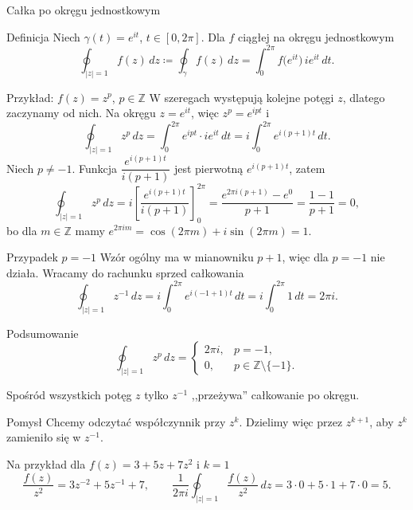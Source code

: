 \documentclass[11pt,aspectratio=169]{beamer}
\newenvironment{definicja}{\begin{exampleblock}{Definicja}}{\end{exampleblock}}
\begin{document}
\begin{frame}{Całka po okręgu jednostkowym}
  \begin{definicja}
    Niech $\gamma(t) = e^{it}$, $t \in [0, 2\pi]$. Dla $f$ ciągłej na okręgu jednostkowym
    \[
      \oint_{|z| = 1} f(z)\, dz \coloneqq \oint_{\gamma} f(z)\, dz = \int_{0}^{2\pi} f\bigl(e^{it}\bigr)\, i e^{it}\, dt .
    \]
  \end{definicja}
\end{frame}

\begin{frame}{Przykład: $f(z) = z^{p}$, $p \in \mathbb{Z}$}
  W szeregach występują kolejne potęgi $z$, dlatego zaczynamy od nich.
  \pause
  Na okręgu $z = e^{it}$, więc $z^{p} = e^{ipt}$ i
  \[
    \oint_{|z| = 1} z^{p}\, dz
    = \int_{0}^{2\pi} e^{ipt} \cdot i e^{it}\, dt
    = i \int_{0}^{2\pi} e^{i(p+1)t}\, dt .
  \]
  \pause
  Niech $p \neq -1$. Funkcja $\dfrac{e^{i(p+1)t}}{i(p+1)}$ jest pierwotną $e^{i(p+1)t}$, zatem
  \[
    \oint_{|z| = 1} z^{p}\, dz
    = i \left[ \frac{e^{i(p+1)t}}{i(p+1)} \right]_{0}^{2\pi}
    = \frac{e^{2\pi i (p+1)} - e^{0}}{p+1}
    = \frac{1 - 1}{p+1}
    = 0 ,
  \]
  \pause
  bo dla $m \in \mathbb{Z}$ mamy $e^{2\pi i m} = \cos(2\pi m) + i \sin(2\pi m) = 1$.
\end{frame}

\begin{frame}{Przypadek $p = -1$}
  Wzór ogólny ma w mianowniku $p + 1$, więc dla $p = -1$ nie działa.
  \pause
  Wracamy do rachunku sprzed całkowania
  \[
    \oint_{|z| = 1} z^{-1}\, dz
    = i \int_{0}^{2\pi} e^{i(-1+1)t}\, dt
    = i \int_{0}^{2\pi} 1\, dt
    = 2\pi i .
  \]
  \pause
  \begin{block}{Podsumowanie}
    \[
      \oint_{|z| = 1} z^{p}\, dz =
      \begin{cases}
        2\pi i, & p = -1, \\
        0, & p \in \mathbb{Z} \setminus \{-1\} .
      \end{cases}
    \]
  \end{block}
  \pause
  Spośród wszystkich potęg $z$ tylko $z^{-1}$ ,,przeżywa'' całkowanie po okręgu.
\end{frame}

\begin{frame}{Pomysł}
  Chcemy odczytać współczynnik przy $z^{k}$. Dzielimy więc przez $z^{k+1}$, aby $z^{k}$ zamieniło się w $z^{-1}$.
  \pause
  \bigskip

  Na przykład dla $f(z) = 3 + 5z + 7z^{2}$ i $k = 1$
  \[
    \frac{f(z)}{z^{2}} = 3 z^{-2} + 5 z^{-1} + 7 ,
    \qquad
    \frac{1}{2\pi i} \oint_{|z| = 1} \frac{f(z)}{z^{2}}\, dz = 3 \cdot 0 + 5 \cdot 1 + 7 \cdot 0 = 5 .
  \]
\end{frame}
\end{document}
